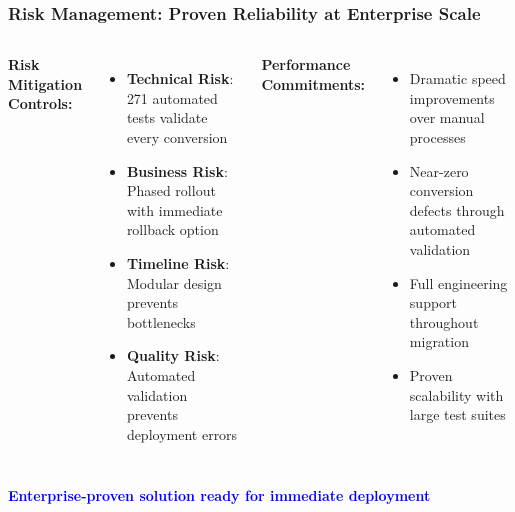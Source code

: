 \begin{frame}
\frametitle{Risk Management: Proven Reliability at Enterprise Scale}
\begin{columns}
\textbf{Risk Mitigation Controls:}
\begin{itemize}
    \item \textbf{Technical Risk}: 271 automated tests validate every conversion
    \item \textbf{Business Risk}: Phased rollout with immediate rollback option
    \item \textbf{Timeline Risk}: Modular design prevents bottlenecks
    \item \textbf{Quality Risk}: Automated validation prevents deployment errors
\end{itemize}

\textbf{Performance Commitments:}
\begin{itemize}
    \item Dramatic speed improvements over manual processes
    \item Near-zero conversion defects through automated validation
    \item Full engineering support throughout migration
    \item Proven scalability with large test suites
\end{itemize}
\end{columns}

\vspace{0.3cm}
\begin{center}
\textcolor{blue}{\textbf{Enterprise-proven solution ready for immediate deployment}}
\end{center}
\end{frame}